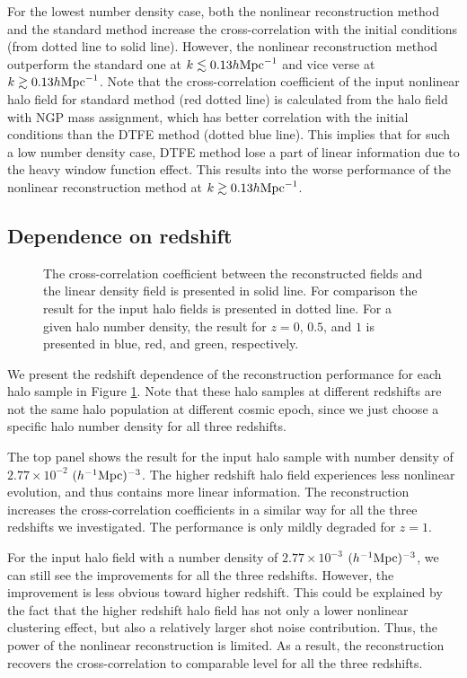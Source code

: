 \documentclass[iop]{emulateapj}
\newcommand{\mpch}{h^{-1} {\rm Mpc}}
\newcommand{\hmpc}{h {\rm Mpc}^{-1}}
\begin{document}
{For the lowest number density case, both the nonlinear reconstruction method and the standard method increase the cross-correlation with the initial conditions (from dotted line to solid line).
However, the nonlinear reconstruction method outperform the standard one at $k\lesssim 0.13 \hmpc$ and vice verse at $k \gtrsim 0.13 \hmpc$.
Note that the cross-correlation coefficient of the input nonlinear halo field for standard method (red dotted line) is calculated from the halo field with NGP mass assignment, which has better correlation with the initial conditions than the DTFE method (dotted blue line).
This implies that for such a low number density case, DTFE method lose a part of linear information due to the heavy window function effect.
This results into the worse performance of the nonlinear reconstruction method at $k\gtrsim 0.13 \hmpc$.


\subsection{Dependence on redshift}
\label{sec:evo}

\begin{figure}
\epsfxsize=8.5cm
\caption{The cross-correlation coefficient between the reconstructed fields and the linear density field is presented in solid line.
For comparison the result for the input halo fields is presented in dotted line.
For a given halo number density, the result for $z=0$, $0.5$, and $1$ is presented in blue, red, and green, respectively.}
\label{fig:numevo}
\end{figure}

We present the redshift dependence of the reconstruction performance for each halo sample in Figure \ref{fig:numevo}.
Note that these halo samples at different redshifts are not the same halo population at different cosmic epoch, since we just choose a specific halo number density for all three redshifts.

The top panel shows the result for the input halo sample with number density of $2.77\times 10^{-2}$ $(\mpch)^{-3}$. 
The higher redshift halo field experiences less nonlinear evolution, and thus contains more linear information.
The reconstruction increases the cross-correlation coefficients in a similar way for all the three redshifts we investigated.
The performance is only mildly degraded for $z=1$.

For the input halo field with a number density of $2.77\times 10^{-3}$ $(\mpch)^{-3}$, we can still see the improvements for all the three redshifts.
However, the improvement is less obvious toward higher redshift.
This could be explained by the fact that the higher redshift halo field has not only a lower nonlinear clustering effect, but also a relatively larger shot noise contribution.
Thus, the power of the nonlinear reconstruction is limited.
As a result, the reconstruction recovers the cross-correlation to comparable level for all the three redshifts.

}
\end{document}
